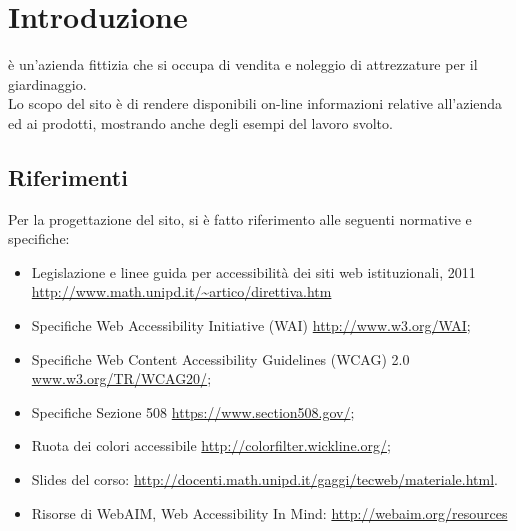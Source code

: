 \section{Introduzione}{
	\textbf{\ggt}  è un'azienda fittizia che si occupa di vendita e noleggio di attrezzature per il giardinaggio. \\
	Lo scopo del sito è di rendere disponibili on-line informazioni relative all'azienda ed ai prodotti, mostrando anche degli esempi del lavoro svolto.
	
    \subsection{Riferimenti}{
		Per la progettazione del sito, si è fatto riferimento alle seguenti normative e specifiche:
		\begin{itemize}\itemsep0.5pt
			\item Legislazione e linee guida per accessibilità dei siti web istituzionali, 2011 \url{http://www.math.unipd.it/~artico/direttiva.htm}
			\item Specifiche Web Accessibility Initiative (WAI)  \url{http://www.w3.org/WAI};
			\item Specifiche Web Content Accessibility Guidelines (WCAG) 2.0 \url{www.w3.org/TR/WCAG20/};
			\item Specifiche Sezione 508 \url{https://www.section508.gov/};
			\item Ruota dei colori accessibile \url{http://colorfilter.wickline.org/};
			\item Slides del corso: \url{http://docenti.math.unipd.it/gaggi/tecweb/materiale.html}.
			\item Risorse di WebAIM, Web Accessibility In Mind: \url{http://webaim.org/resources}
		\end{itemize}
    }
}
